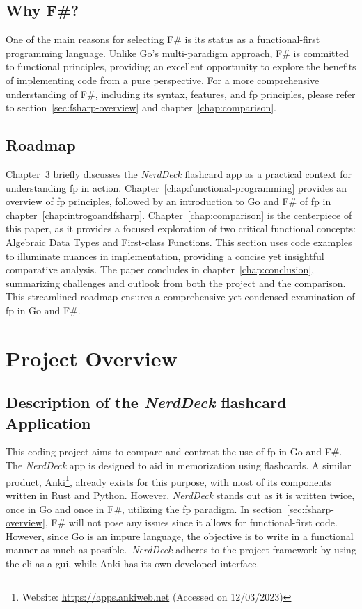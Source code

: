     \section{Why F\#?}\label{sec:whyfsharp}
    One of the main reasons for selecting F\# is its status as a functional-first programming language. Unlike Go's multi-paradigm approach, F\# is committed to functional principles, providing an excellent opportunity to explore the benefits of implementing code from a pure perspective.
    For a more comprehensive understanding of F\#, including its syntax, features, and \ac{fp} principles, please refer to section\ \ref{sec:fsharp-overview} and chapter\ \ref{chap:comparison}.

    \section{Roadmap}\label{sec:roadmap}
    Chapter\ \ref{chap:project-overview} briefly discusses the \textit{NerdDeck} flashcard \ac{app} as a practical context for understanding \ac{fp} in action. Chapter\ \ref{chap:functional-programming} provides an overview of \ac{fp} principles, followed by an introduction to Go and F\# of \ac{fp} in chapter\ \ref{chap:introgoandfsharp}. Chapter\ \ref{chap:comparison} is the centerpiece of this paper, as it provides a focused exploration of two critical functional concepts: Algebraic Data Types and First-class Functions. This section uses code examples to illuminate nuances in implementation, providing a concise yet insightful comparative analysis. The paper concludes in chapter\ \ref{chap:conclusion}, summarizing challenges and outlook from both the project and the comparison. This streamlined roadmap ensures
    a comprehensive yet condensed examination of \ac{fp} in Go and F\#.



\chapter{Project Overview}\label{chap:project-overview}
    \section{Description of the \textit{NerdDeck} flashcard Application}\label{sec:descriptionofnerddeck}
    This coding project aims to compare and contrast the use of \ac{fp} in Go and F\#. The \textit{NerdDeck} \ac{app} is designed to aid in memorization using flashcards. A similar product, Anki\footnote{Website: \url{https://apps.ankiweb.net} (Accessed on 12/03/2023)}, already exists for this purpose, with most of its components written in Rust and Python. However, \textit{NerdDeck} stands out as it is written twice, once in Go and once in F\#, utilizing the \ac{fp} paradigm. In section\ \ref{sec:fsharp-overview}, F\# will not pose any issues since it allows for functional-first code. However, since Go is an impure language, the objective is to write in a functional manner as much as possible.\ \textit{NerdDeck} adheres to the project framework by using the \ac{cli} as a \ac{gui}, while Anki has its own developed interface.

